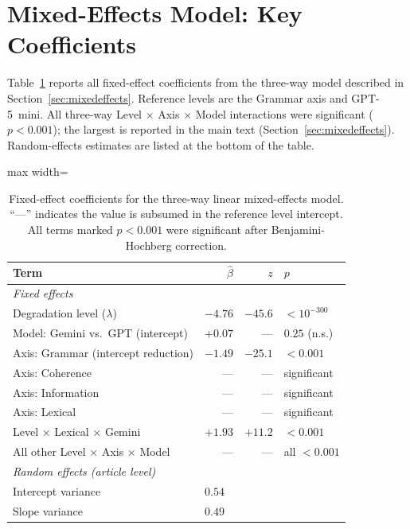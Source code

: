 \documentclass[11pt]{article}
\begin{document}
\section{Mixed-Effects Model: Key Coefficients}
\label{app:mixed}

Table~\ref{tab:mixedeffects_app} reports all fixed-effect coefficients
from the three-way model described in Section~\ref{sec:mixedeffects}.
Reference levels are the Grammar axis and GPT-5~mini. All three-way
Level $\times$ Axis $\times$ Model interactions were significant
($p < 0.001$); the largest is reported in the main text
(Section~\ref{sec:mixedeffects}).
Random-effects estimates are listed at the bottom of the table.

\begin{table}[H]
\centering
\caption{Fixed-effect coefficients for the three-way linear
mixed-effects model. ``---'' indicates the value is subsumed in the
reference level intercept. All terms marked $p < 0.001$ were
significant after Benjamini-Hochberg correction.}
\label{tab:mixedeffects_app}
\small
\begin{adjustbox}{max width=\columnwidth}
\begin{tabular}{@{}lrrl@{}}
\toprule
\textbf{Term} & $\hat{\beta}$ & $z$ & $p$ \\
\midrule
\multicolumn{4}{l}{\textit{Fixed effects}} \\
Degradation level ($\lambda$) & $-4.76$ & $-45.6$ & $<10^{-300}$ \\
Model: Gemini vs.\ GPT (intercept) & $+0.07$ & --- & $0.25$ (n.s.) \\
Axis: Grammar (intercept reduction) & $-1.49$ & $-25.1$ & $<0.001$ \\
Axis: Coherence & --- & --- & significant \\
Axis: Information & --- & --- & significant \\
Axis: Lexical & --- & --- & significant \\
Level $\times$ Lexical $\times$ Gemini & $+1.93$ & $+11.2$ & $<0.001$ \\
All other Level $\times$ Axis $\times$ Model & --- & --- & all $<0.001$ \\
\midrule
\multicolumn{4}{l}{\textit{Random effects (article level)}} \\
Intercept variance & \multicolumn{3}{l}{$0.54$} \\
Slope variance & \multicolumn{3}{l}{$0.49$} \\
\bottomrule
\end{tabular}
\end{adjustbox}
\end{table}
\end{document}
